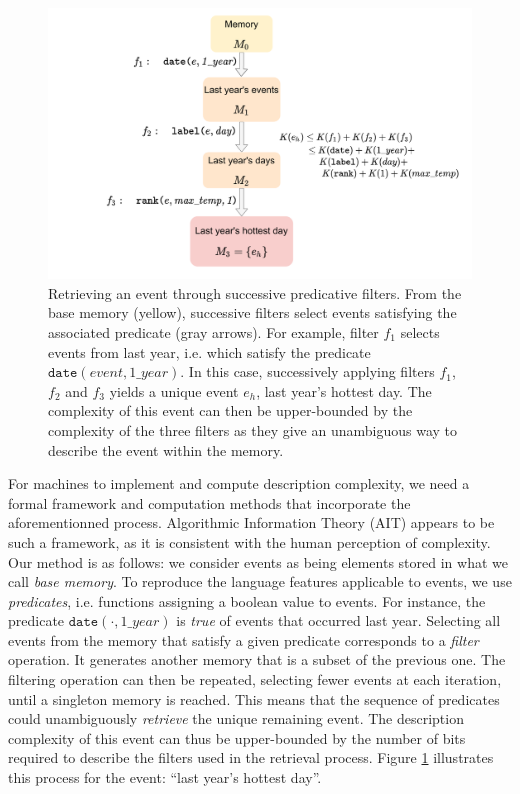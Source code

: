 \documentclass[entropy,article,submit,moreauthors,pdftex]{Definitions/mdpi}
\begin{document}
\begin{figure}[!ht]
    \centering
    \includegraphics[width=.95\linewidth]{figures/filters}
    \caption{Retrieving an event through successive predicative
        filters. From the base memory (yellow), successive filters select events satisfying the associated predicate (gray arrows). For example,
        filter $f_1$ selects events from last year, i.e. which satisfy the
        predicate $\mathtt{date}(event, 1\_year)$. In this case, successively
        applying filters $f_1$, $f_2$ and $f_3$ yields a unique event $e_h$, last
        year's hottest day. The complexity of this event can then be upper-bounded
        by the complexity of the three filters as they give an unambiguous way
        to describe the event within the memory.}
    \label{fig:filters}
\end{figure}

For machines to implement and compute description complexity, we need a formal framework and computation methods that incorporate the aforementionned process. Algorithmic Information Theory (AIT) appears to be such a framework, as it is consistent with the human perception of complexity\cite{li_introduction_2008,dessalles_coincidences_2011,delahaye_numerical_2012}. Our method is as follows: we
consider events as being elements stored in what we call \emph{base memory}. To
reproduce the language features applicable to events, we use \emph
{predicates}, i.e. functions assigning a boolean value to events. For instance, the predicate $\mathtt{date}
(\cdot, 1\_year)$ is \emph{true} of events that occurred last year. Selecting
all events from the memory that satisfy a given predicate corresponds to
a \emph{filter} operation. It generates another memory that is a subset of the previous one.
The filtering operation can then be repeated, selecting
fewer events at each iteration, until a singleton memory is reached. This means that the sequence
of predicates could unambiguously \emph{retrieve} the unique remaining event.
The description complexity of this event can thus be upper-bounded by the
number of bits required to describe the filters used in the retrieval
process. Figure \ref{fig:filters} illustrates this process for the event: ``last year's hottest day''.
\end{document}
